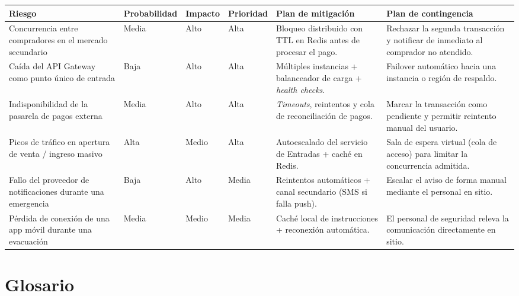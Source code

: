 \documentclass[11pt,a4paper]{article}
\begin{document}
\begin{center}
\begin{longtable}{|p{2.6cm}|p{1.7cm}|p{1.6cm}|p{1.5cm}|p{2.9cm}|p{2.9cm}|}
\hline
\textbf{Riesgo} & \textbf{Probabilidad} & \textbf{Impacto} & \textbf{Prioridad} & \textbf{Plan de
mitigación} & \textbf{Plan de contingencia} \\
\hline
\endhead
Concurrencia entre compradores en el mercado secundario & Media & Alto & Alta & Bloqueo
distribuido con TTL en Redis antes de procesar el pago. & Rechazar la segunda transacción y
notificar de inmediato al comprador no atendido.\\
\hline
Caída del API Gateway como punto único de entrada & Baja & Alto & Alta & Múltiples instancias +
balanceador de carga + \textit{health checks}. & Failover automático hacia una instancia o región
de respaldo.\\
\hline
Indisponibilidad de la pasarela de pagos externa & Media & Alto & Alta & \textit{Timeouts},
reintentos y cola de reconciliación de pagos. & Marcar la transacción como pendiente y permitir
reintento manual del usuario.\\
\hline
Picos de tráfico en apertura de venta / ingreso masivo & Alta & Medio & Alta & Autoescalado del
servicio de Entradas + caché en Redis. & Sala de espera virtual (cola de acceso) para limitar la
concurrencia admitida.\\
\hline
Fallo del proveedor de notificaciones durante una emergencia & Baja & Alto & Media & Reintentos
automáticos + canal secundario (SMS si falla push). & Escalar el aviso de forma manual mediante el
personal en sitio.\\
\hline
Pérdida de conexión de una app móvil durante una evacuación & Media & Medio & Media & Caché local
de instrucciones + reconexión automática. & El personal de seguridad releva la comunicación
directamente en sitio.\\
\hline
\end{longtable}
\end{center}

\section{Glosario}
\label{sec:glosario}
\end{document}
